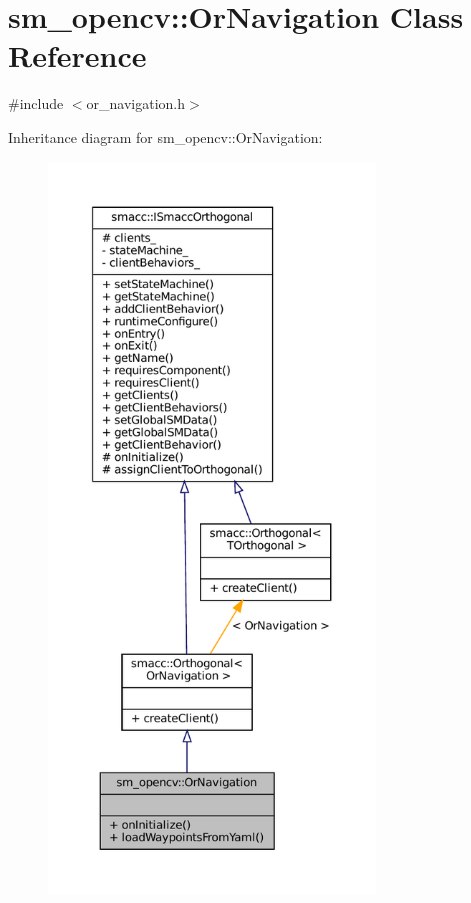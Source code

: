 \hypertarget{classsm__opencv_1_1OrNavigation}{}\section{sm\+\_\+opencv\+:\+:Or\+Navigation Class Reference}
\label{classsm__opencv_1_1OrNavigation}


{\ttfamily \#include $<$or\+\_\+navigation.\+h$>$}



Inheritance diagram for sm\+\_\+opencv\+:\+:Or\+Navigation\+:
\nopagebreak
\begin{figure}[H]
\begin{center}
\leavevmode
\includegraphics[height=550pt]{classsm__opencv_1_1OrNavigation__inherit__graph}
\end{center}
\end{figure}


